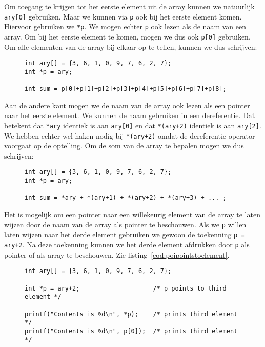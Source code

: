 Om toegang te krijgen tot het eerste element uit de array kunnen we natuurlijk \texttt{ary[0]} gebruiken. Maar we kunnen via \texttt{p} ook bij het eerste element komen. Hiervoor gebruiken we \texttt{*p}. We mogen echter \texttt{p} ook lezen als de naam van een array. Om bij het eerste element te komen, mogen we dus ook \texttt{p[0]} gebruiken. Om alle elementen van de array bij elkaar op te tellen, kunnen we dus schrijven:

\begin{figure}[!ht]
\begin{lstlisting}[caption=Bepalen van de som van elementen in een array.,label=cod:poiarrayandpointersym]
int ary[] = {3, 6, 1, 0, 9, 7, 6, 2, 7};
int *p = ary;

int sum = p[0]+p[1]+p[2]+p[3]+p[4]+p[5]+p[6]+p[7]+p[8];
\end{lstlisting}
\end{figure}

Aan de andere kant mogen we de naam van de array ook lezen als een pointer naar het eerste element. We kunnen de naam gebruiken in een dereferentie. Dat betekent dat \texttt{*ary} identiek is aan \texttt{ary[0]} en dat \texttt{*(ary+2)} identiek is aan \texttt{ary[2]}. We hebben echter wel haken nodig bij \texttt{*(ary+2)} omdat de dereferentie-operator voorgaat op de optelling. Om de som van de array te bepalen mogen we dus schrijven:

\begin{figure}[!ht]
\begin{lstlisting}[caption=Bepalen van de som van elementen in een array.,label=cod:poiarrayandpointersym2]
int ary[] = {3, 6, 1, 0, 9, 7, 6, 2, 7};
int *p = ary;

int sum = *ary + *(ary+1) + *(ary+2) + *(ary+3) + ... ;
\end{lstlisting}
\end{figure}

Het is mogelijk om een pointer naar een willekeurig element van de array te laten wijzen door de naam van de array als pointer te beschouwen. Als we \texttt{p} willen laten wijzen naar het derde element gebruiken we gewoon de toekenning \texttt{p = ary+2}. Na deze toekenning kunnen we het derde element afdrukken door \texttt{p} als pointer of als array te beschouwen. Zie listing~\ref{cod:poipointstoelement}.

\begin{figure}[!ht]
\begin{lstlisting}[caption=Pointer die naar een element in een array wijst.,label=cod:poipointstoelement]
int ary[] = {3, 6, 1, 0, 9, 7, 6, 2, 7};

int *p = ary+2;                    /* p points to third element */

printf("Contents is %d\n", *p);    /* prints third element */
printf("Contents is %d\n", p[0]);  /* prints third element */
\end{lstlisting}
\end{figure}

